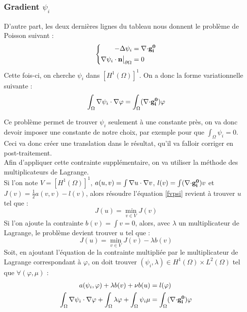 \subsubsection{Gradient $\psi_i$}
\label{multLagrange}

D'autre part, les deux dernières lignes du tableau nous donnent le problème de Poisson suivant :
\begin{equation}
\label{psi}
\left\{
\begin{aligned}
-{\Delta}\psi_i &= {\nabla\cdot} \mathbf{g_i^0}\\
{\nabla}\psi_i\cdot \mathbf{n}{\big\rvert_{\partial\Omega}} &= 0
\end{aligned}
\right.
\end{equation}
Cette fois-ci, on cherche $\psi_i$ dans $[H^1(\Omega)]^1$. On a donc la forme variationnelle suivante :
\begin{equation}
\label{fvpsi}
\int_\Omega {\nabla}\psi_i\cdot{\nabla}\varphi = \int_\Omega ({\nabla\cdot} \mathbf{g_i^0})\varphi
\end{equation}

Ce problème permet de trouver $\psi_i$ seulement à une constante près, on va donc devoir imposer une constante de notre choix, par exemple pour que $\int_\Omega \psi_i = 0$. Ceci va donc créer une translation dans le résultat, qu'il va falloir corriger en post-traitement.\\
Afin d'appliquer cette contrainte supplémentaire, on va utiliser la méthode des multiplicateurs de Lagrange.\\
Si l'on note $V=[H^1(\Omega)]^1$, $a(u,v)=\int {\nabla} u \cdot {\nabla} v$, $l(v)=\int ({\nabla\cdot} \mathbf{g_i^0})v$ et $J(v)=\frac{1}{2}a(v,v)-l(v)$, alors résoudre l'équation \ref{fvpsi} revient à trouver $u$ tel que :
\[
J(u) = \min_{v\in V} J(v)
\]
Si l'on ajoute la contrainte $b(v) = \int v = 0$, alors, avec $\lambda$ un multiplicateur de Lagrange, le problème devient trouver $u$ tel que :
\[
J(u) = \min_{v\in V} J(v) - \lambda b(v)
\]
Soit, en ajoutant l'équation de la contrainte multipliée par le multiplicateur de Lagrange correspondant à $\varphi$, on doit trouver $(\psi_i,\lambda)\in H^1(\Omega)\times L^2(\Omega)$ tel que $\forall (\varphi,\mu)$ :
\begin{align}
\label{fvpsiml}
a(\psi_i,\varphi) + \lambda b(v) + \nu b(u) &= l(\varphi) \notag \\
\int_\Omega {\nabla}\psi_i\cdot{\nabla}\varphi + \int_\Omega \lambda\varphi + \int_\Omega \psi_i\mu &= \int_\Omega ({\nabla\cdot} \mathbf{g_i^0})\varphi
\end{align}

